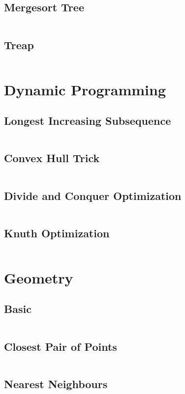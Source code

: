 \documentclass[a4paper, 10pt, twocolumn, landscape]{article}
\begin{document}
\subsection{Mergesort Tree}
\inputminted{cpp}{data-structures/mergesort-tree.cpp}
\subsection{Treap}
\inputminted{cpp}{data-structures/treap.cpp}

\section{Dynamic Programming}
\subsection{Longest Increasing Subsequence}
\inputminted{cpp}{dynamic-programming/lis.cpp}
\subsection{Convex Hull Trick}
\inputminted{cpp}{dynamic-programming/convex-hull-trick.cpp}
\subsection{Divide and Conquer Optimization}
\inputminted{cpp}{dynamic-programming/divide-and-conquer-optimization.cpp}
\subsection{Knuth Optimization}
\inputminted{cpp}{dynamic-programming/knuth-optimization.cpp}

\section{Geometry}
\subsection{Basic}
\inputminted{cpp}{geometry/basics.cpp}
\subsection{Closest Pair of Points}
\inputminted{cpp}{geometry/closest-pair.cpp}
\subsection{Nearest Neighbours}
\inputminted{cpp}{geometry/neighbour.cpp}
\end{document}
